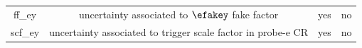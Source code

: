 \begin{table}[!htbp]
\begin{tabular}{ c | c  | c | c}
      ff\_ey  &  uncertainty associated to $\efakey$ fake factor  & yes & no   \\ 
      scf\_ey  &  uncertainty associated to trigger scale factor in probe-e CR  & yes  & no  \\ 
      \hline
    \end{tabular}
\end{table}


